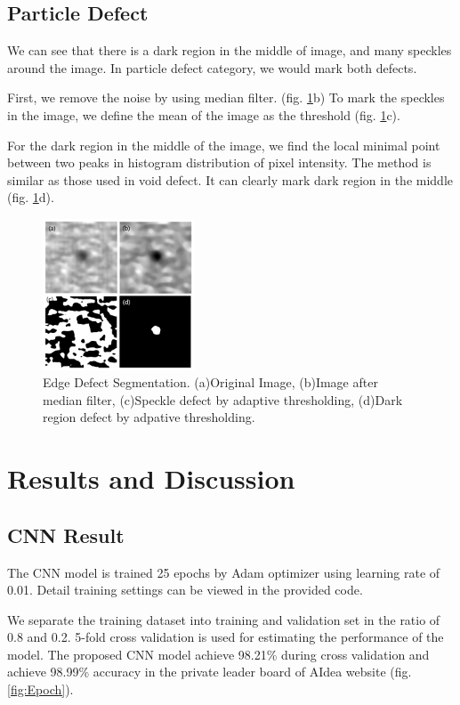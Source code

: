 \documentclass[conference]{IEEEtran}
\begin{document}
\begin{CJK}{UTF8}{bsmi}
\subsection{Particle Defect}
We can see that there is a dark region in the middle of image, and many speckles around the image. In particle defect category, we would mark both defects.

First, we remove the noise by using median filter. (fig. \ref{fig:Particle}b) To mark the speckles in the image, we define the mean of the image as the threshold (fig. \ref{fig:Particle}c).

For the dark region in the middle of the image, we find the local minimal point between two peaks in histogram distribution of pixel intensity. The method is similar as those used in void defect. It can clearly mark dark region in the middle (fig. \ref{fig:Particle}d).

\begin{figure}[!htbp]
\centerline{\includegraphics[width=0.4\textwidth]{../figures/Particle.png}}
\caption{Edge Defect Segmentation. (a)Original Image, (b)Image after median filter, (c)Speckle defect by adaptive thresholding, (d)Dark region defect by adpative thresholding.}
\label{fig:Particle}
\end{figure}

\section{Results and Discussion}
\subsection{CNN Result}
The CNN model is trained 25 epochs by Adam optimizer using learning rate of 0.01. Detail training settings can be viewed in the provided code.

We separate the training dataset into training and validation set in the ratio of 0.8 and 0.2. 5-fold cross validation is used for estimating the performance of the model. The proposed CNN model achieve 98.21\% during cross validation and achieve 98.99\% accuracy in the private leader board of AIdea website (fig. \ref{fig:Epoch}).


\end{CJK}
\end{document}
